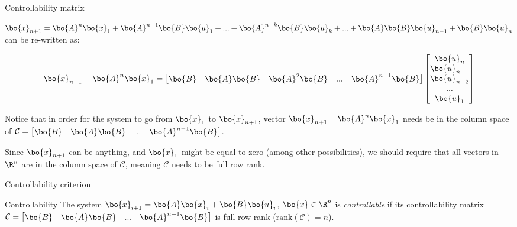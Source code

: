 \documentclass{beamer}
\begin{document}
\begin{frame}{Controllability matrix}
\begin{flushleft}

$\bo{x}_{n+1} = \bo{A}^n \bo{x}_1 + \bo{A}^{n-1} \bo{B} \bo{u}_1 + ... 
+ \bo{A}^{n - k} \bo{B} \bo{u}_{k} + ... +
\bo{A} \bo{B} \bo{u}_{n-1} + \bo{B} \bo{u}_n$ can be re-written as:

\begin{equation}
    \bo{x}_{n+1} - \bo{A}^n \bo{x}_1 = 
    \begin{bmatrix}
    \bo{B} &
    \bo{A} \bo{B} &
    \bo{A}^2 \bo{B} & ... &
    \bo{A}^{n - 1} \bo{B}
    \end{bmatrix}    
    \begin{bmatrix}
    \bo{u}_{n} \\
    \bo{u}_{n-1} \\
    \bo{u}_{n-2} \\ ... \\
    \bo{u}_{1}
    \end{bmatrix}
\end{equation}

Notice that in order for the system to go from $\bo{x}_1$ to $\bo{x}_{n+1}$, vector $\bo{x}_{n+1} - \bo{A}^n \bo{x}_1$ needs be in the column space of $\mathcal{C} = \begin{bmatrix}
    \bo{B} &
    \bo{A} \bo{B} & ... &
    \bo{A}^{n - 1} \bo{B}
    \end{bmatrix}$.

Since $\bo{x}_{n+1}$ can be anything, and $\bo{x}_1$ might be equal to zero (among other possibilities), we should require that all vectors in $\R^n$ are in the column space of $\mathcal{C}$, meaning $\mathcal{C}$ needs to be full row rank.

\end{flushleft}
\end{frame}


\begin{frame}{Controllability criterion}
\begin{flushleft}

\begin{block}{Controllability}
The system $\bo{x}_{i+1} = \bo{A}  \bo{x}_i + \bo{B} \bo{u}_i$, $\bo{x} \in \R^n$ is \emph{controllable} if its controllability matrix $\mathcal{C} = \begin{bmatrix}
    \bo{B} &
    \bo{A} \bo{B} & ... &
    \bo{A}^{n - 1} \bo{B}
    \end{bmatrix}$ is full row-rank ($\text{rank}(\mathcal{C}) = n$).
\end{block}

\end{flushleft}
\end{frame}
\end{document}
